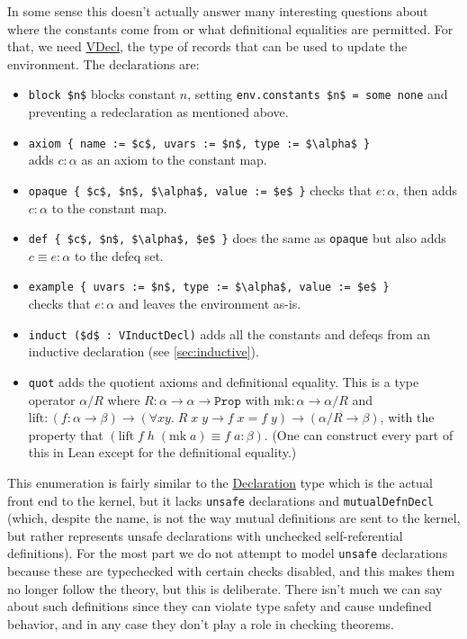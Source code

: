 \documentclass[sigplan,10pt,screen]{acmart}\settopmatter{printfolios=true,printccs=false,printacmref=false}
\newcommand{\code}[1]{\mbox{\ttfamily\small #1}}
\begin{document}
In some sense this doesn't actually answer many interesting questions about where the constants come from or what definitional equalities are permitted. For that, we need \href{https://github.com/digama0/lean4lean/blob/cpp2026/Lean4Lean/Theory/VDecl.lean#L22}{\code{VDecl}}, the type of records that can be used to update the environment. The declarations are:
\begin{itemize}
  \item \lstinline|block $n$| blocks constant $n$, setting \lstinline|env.constants $n$ = some none| and preventing a redeclaration as mentioned above.
  \item \lstinline|axiom { name := $c$, uvars := $n$, type := $\alpha$ }|\\ adds $c:\alpha$ as an axiom to the constant map.
  \item \lstinline|opaque { $c$, $n$, $\alpha$, value := $e$ }| checks that $e:\alpha$, then adds $c:\alpha$ to the constant map.
  \item \lstinline|def { $c$, $n$, $\alpha$, $e$ }| does the same as \lstinline|opaque| but also adds $c\equiv e:\alpha$ to the defeq set.
  \item \lstinline|example { uvars := $n$, type := $\alpha$, value := $e$ }|\\ checks that $e:\alpha$ and leaves the environment as-is.
  \item \lstinline|induct ($d$ : VInductDecl)| adds all the constants and defeqs from an inductive declaration (see \autoref{sec:inductive}).
  \item \lstinline|quot| adds the quotient axioms and definitional equality. This is a type operator $\alpha/R$ where $R:\alpha\to\alpha\to\mathtt{Prop}$ with $\mbox{mk}:\alpha\to\alpha/R$ and $\mbox{lift}:(f:\alpha\to\beta)\to(\forall x y.\;R\;x\;y\to f\;x=f\;y)\to (\alpha/R\to\beta)$, with the property that $(\mbox{lift}\;f\;h\;(\mbox{mk}\;a)\equiv f\;a:\beta)$. (One can construct every part of this in Lean except for the definitional equality.)
\end{itemize}

This enumeration is fairly similar to the \href{https://github.com/leanprover/lean4/blob/v4.20.1/src/Lean/Declaration.lean#L173}{\code{Declaration}} type which is the actual front end to the kernel, but it lacks \lstinline|unsafe| declarations and \lstinline|mutualDefnDecl| (which, despite the name, is not the way mutual definitions are sent to the kernel, but rather represents unsafe declarations with unchecked self-referential definitions). For the most part we do not attempt to model \lstinline|unsafe| declarations because these are typechecked with certain checks disabled, and this makes them no longer follow the theory, but this is deliberate. There isn't much we can say about such definitions since they can violate type safety and cause undefined behavior, and in any case they don't play a role in checking theorems.
\end{document}
